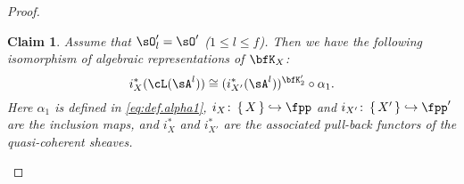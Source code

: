\documentclass[12pt,a4paper]{amsart}
\numberwithin{equation}{section}
\newtheorem*{claim*}{Claim}
\theoremstyle{remark}
\def\dliftv{\vartheta}
\def\slift{\cL}
\def\ZX{\cZ_{X}}
\def\bsOp{\overline{\sO'}}
\begin{document}
\begin{proof}

\begin{claim*}
Assume that $\sO'_l=\sO'$ ($1\leq l\leq f$). Then we have  the following isomorphism
of algebraic representations of $\bfK_X$:
\[%
   i^*_{X}(\slift(\sA^l))\cong (i^*_{X'}(\sA^l))^{\bfK'_2} \circ \alpha_1.
 \]%
 Here $\alpha_1$ is
 defined in \cref{eq:def.alpha1}, $i_X\colon \set{X}\hookrightarrow \fpp$ and
 $i_{X'}\colon \set{X'}\hookrightarrow \fpp'$ are the inclusion maps, and
 $i^*_{X}$ and $ i^*_{X'}$ are the associated pull-back functors of the
 quasi-coherent sheaves.
\end{claim*}



  \def\mX{\rmm_{\fpp}(X)} \def\kX{\kappa(X)}
  \def\ZX{\cZ_X}
  \def\ZXO{Z_{X,\bsOp}}


\end{proof}
\end{document}
